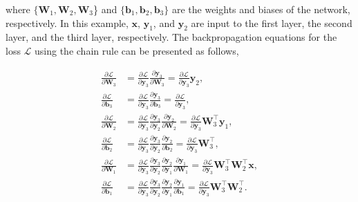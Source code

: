 \documentclass[sigconf]{acmart}
\begin{document}
    where $\{\mathbf{W}_1, \mathbf{W}_2, \mathbf{W}_3$\} and $\{\mathbf{b}_1, \mathbf{b}_2, \mathbf{b}_3\}$ are the weights and biases of the network, respectively. In this example, $\mathbf{x}$, $\mathbf{y}_1$, and $\mathbf{y}_2$ are input to the first layer, the second layer, and the third layer, respectively. 
    The backpropagation equations for the loss $\mathcal{L}$ using the chain rule can be presented as follows,
    
    \begin{align}
        \frac{\partial \mathcal{L}}{\partial \mathbf{W}_3} &= \frac{\partial \mathcal{L}}{\partial \mathbf{y}_3} \frac{\partial \mathbf{y}_3}{\partial \mathbf{W}_3} = \frac{\partial \mathcal{L}}{\partial \mathbf{y}_3} \mathbf{y}_2, \\
        \frac{\partial \mathcal{L}}{\partial \mathbf{b}_3} &= \frac{\partial \mathcal{L}}{\partial \mathbf{y}_3} \frac{\partial \mathbf{y}_3}{\partial \mathbf{b}_3} = \frac{\partial \mathcal{L}}{\partial \mathbf{y}_3}, \\
        \frac{\partial \mathcal{L}}{\partial \mathbf{W}_2} &= \frac{\partial \mathcal{L}}{\partial \mathbf{y}_3} \frac{\partial \mathbf{y}_3}{\partial \mathbf{y}_2} \frac{\partial \mathbf{y}_2}{\partial \mathbf{W}_2} = \frac{\partial \mathcal{L}}{\partial \mathbf{y}_3} \mathbf{W}_3^\top \mathbf{y}_1, \\
        \frac{\partial \mathcal{L}}{\partial \mathbf{b}_2} &= \frac{\partial \mathcal{L}}{\partial \mathbf{y}_3} \frac{\partial \mathbf{y}_3}{\partial \mathbf{y}_2} \frac{\partial \mathbf{y}_2}{\partial \mathbf{b}_2} = \frac{\partial \mathcal{L}}{\partial \mathbf{y}_3} \mathbf{W}_3^\top, \\
        \frac{\partial \mathcal{L}}{\partial \mathbf{W}_1} &= \frac{\partial \mathcal{L}}{\partial \mathbf{y}_3} \frac{\partial \mathbf{y}_3}{\partial \mathbf{y}_2} \frac{\partial \mathbf{y}_2}{\partial \mathbf{y}_1} \frac{\partial \mathbf{y}_1}{\partial \mathbf{W}_1} = \frac{\partial \mathcal{L}}{\partial \mathbf{y}_3} \mathbf{W}_3^\top \mathbf{W}_2^\top \mathbf{x}, \\
        \frac{\partial \mathcal{L}}{\partial \mathbf{b}_1} &= \frac{\partial \mathcal{L}}{\partial \mathbf{y}_3} \frac{\partial \mathbf{y}_3}{\partial \mathbf{y}_2} \frac{\partial \mathbf{y}_2}{\partial \mathbf{y}_1} \frac{\partial \mathbf{y}_1}{\partial \mathbf{b}_1} = \frac{\partial \mathcal{L}}{\partial \mathbf{y}_3} \mathbf{W}_3^\top \mathbf{W}_2^\top.
    \end{align}
\end{document}
